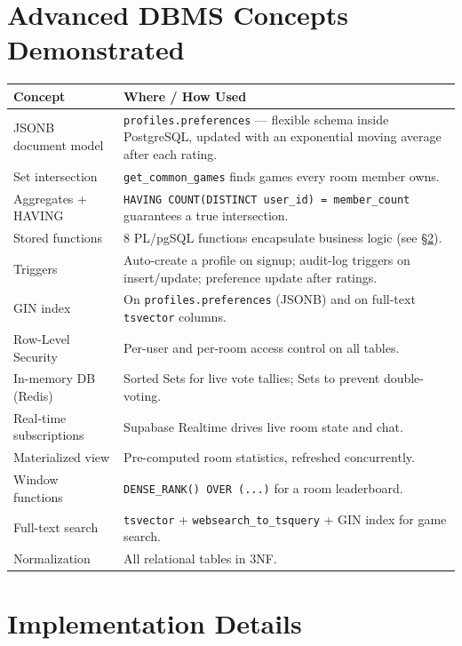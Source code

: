 \documentclass[11pt,a4paper]{article}
\begin{document}
\section{Advanced DBMS Concepts Demonstrated}
\begin{longtable}{p{4.2cm} p{9.6cm}}
\toprule
\textbf{Concept} & \textbf{Where / How Used} \\
\midrule
JSONB document model & \texttt{profiles.preferences} --- flexible schema inside PostgreSQL, updated with an exponential moving average after each rating. \\
Set intersection & \texttt{get\_common\_games} finds games every room member owns. \\
Aggregates + HAVING & \texttt{HAVING COUNT(DISTINCT user\_id) = member\_count} guarantees a true intersection. \\
Stored functions & 8 PL/pgSQL functions encapsulate business logic (see \S\ref{sec:impl}). \\
Triggers & Auto-create a profile on signup; audit-log triggers on insert/update; preference update after ratings. \\
GIN index & On \texttt{profiles.preferences} (JSONB) and on full-text \texttt{tsvector} columns. \\
Row-Level Security & Per-user and per-room access control on all tables. \\
In-memory DB (Redis) & Sorted Sets for live vote tallies; Sets to prevent double-voting. \\
Real-time subscriptions & Supabase Realtime drives live room state and chat. \\
Materialized view & Pre-computed room statistics, refreshed concurrently. \\
Window functions & \texttt{DENSE\_RANK() OVER (...)} for a room leaderboard. \\
Full-text search & \texttt{tsvector} + \texttt{websearch\_to\_tsquery} + GIN index for game search. \\
Normalization & All relational tables in 3NF. \\
\bottomrule
\end{longtable}

\section{Implementation Details}\label{sec:impl}
\end{document}
